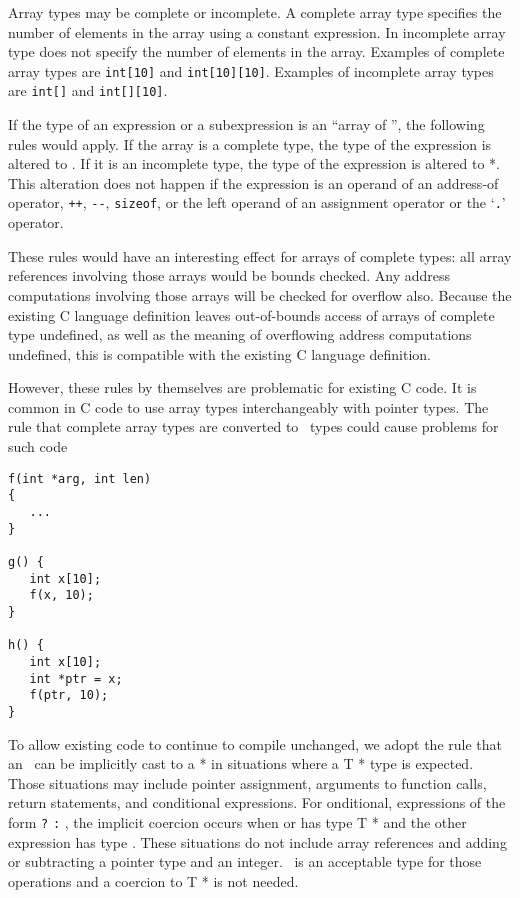 Array types may be complete or incomplete. A complete array type
specifies the number of elements in the array using a constant
expression. In incomplete array type does not specify the number of
elements in the array. Examples of complete array types are 
\texttt{int[10]}
and \texttt{int[10][10]}. Examples of incomplete array types are
\texttt{int[]} and \texttt{int[][10]}.

If the type of an expression or a subexpression is an ``array of
'', the following rules would apply. If the array is a complete
type, the type of the expression is altered to
\arrayptrT. If it is
an incomplete type, the type of the expression is altered to  *.
This alteration does not happen if the expression is an operand of an
address-of operator, \texttt{++}, \texttt{-\/-}, \texttt{sizeof}, or the
left operand of an assignment operator or the `\texttt{.}' operator.

These rules would have an interesting effect for arrays of complete
types: all array references involving those arrays would be bounds
checked. Any address computations involving those arrays will be checked
for overflow also. Because the existing C language definition leaves
out-of-bounds access of arrays of complete type undefined, as well as
the meaning of overflowing address computations undefined, this is
compatible with the existing C language definition.

However, these rules by themselves are problematic for existing C code.
It is common in C code to use array types interchangeably with pointer
types. The rule that complete array types are converted to
\arrayptr\ types could cause problems for such code

\begin{verbatim}
f(int *arg, int len)
{ 
   ...
}

g() {
   int x[10];
   f(x, 10);
}

h() {
   int x[10];
   int *ptr = x;
   f(ptr, 10);
}
\end{verbatim}

To allow existing code to continue to compile unchanged, we adopt the
rule that an \arrayptrT\ can be
implicitly cast to a  * in situations where a T * type is
expected. Those situations may include pointer assignment, arguments to
function calls, return statements, and conditional expressions. For
onditional, expressions of the form  \texttt{?}  \texttt{:}
, the implicit coercion occurs when  or  has type T * and
the other expression has type
\arrayptrT. These situations do not
include array references and adding or subtracting a pointer type and an
integer. \arrayptrT\ is an acceptable
type for those operations and a coercion to T * is not needed.

